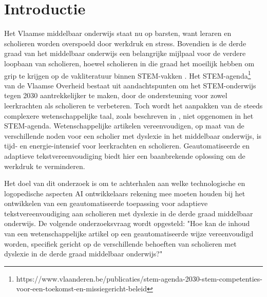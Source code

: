 
\section{Introductie}%
\label{sec:introductie}


Het Vlaamse middelbaar onderwijs staat nu op barsten, want leraren en scholieren worden overspoeld door werkdruk en stress. Bovendien is de derde graad van het middelbaar onderwijs een belangrijke mijlpaal voor de verdere loopbaan van scholieren, hoewel scholieren in die graad het moeilijk hebben om grip te krijgen op de vakliteratuur binnen STEM-vakken \autocite{Dapaah2022}. Het STEM-agenda\footnote{https://www.vlaanderen.be/publicaties/stem-agenda-2030-stem-competenties-voor-een-toekomst-en-missiegericht-beleid} van de Vlaamse Overheid bestaat uit aandachtspunten om het STEM-onderwijs tegen 2030 aantrekkelijker te maken, door de ondersteuning voor zowel leerkrachten als scholieren te verbeteren. Toch wordt het aanpakken van de steeds complexere wetenschappelijke taal, zoals beschreven in \textcite{Barnett2020}, niet opgenomen in het STEM-agenda. Wetenschappelijke artikelen vereenvoudigen, op maat van de verschillende noden voor een scholier met dyslexie in het middelbaar onderwijs, is tijd- en energie-intensief voor leerkrachten en scholieren. Geautomatiseerde en adaptieve tekstvereenvoudiging biedt hier een baanbrekende oplossing om de werkdruk te verminderen.

Het doel van dit onderzoek is om te achterhalen aan welke technologische en logopedische aspecten AI ontwikkelaars rekening mee moeten houden bij het ontwikkelen van een geautomatiseerde toepassing voor adaptieve tekstvereenvoudiging aan scholieren met dyslexie in de derde graad middelbaar onderwijs. De volgende onderzoeksvraag wordt opgesteld: "Hoe kan de inhoud van een wetenschappelijke artikel op een geautomatiseerde wijze vereenvoudigd worden, specifiek gericht op de verschillende behoeften van scholieren met dyslexie in de derde graad middelbaar onderwijs?" 

